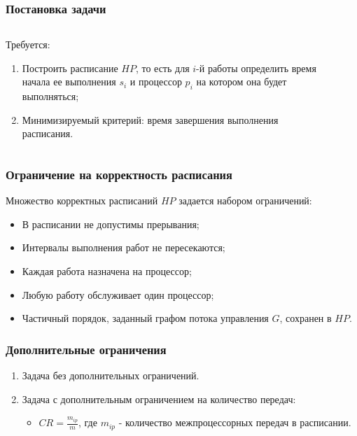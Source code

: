\begin{frame}
    \frametitle{Постановка задачи}
    \begin{columns}
        \begin{column}{0.7\textwidth}
            Требуется:
            \begin{enumerate}
                \item Построить расписание $HP$, то есть для $i$-й работы определить время начала ее выполнения $s_i$ и процессор $p_i$ на котором она будет выполняться;
                \item Минимизируемый критерий: время завершения выполнения расписания.
            \end{enumerate}
        \end{column}
        \begin{column}{0.3\textwidth}
            \begin{figure}
                \tiny
                \captionsetup{labelformat=empty}
            \end{figure}
        \end{column}
    \end{columns}
\end{frame}

\begin{frame}
    \frametitle{Ограничение на корректность расписания}
    Множество корректных расписаний $HP$ задается набором ограничений:
    \begin{itemize}
        \item В расписании не допустимы прерывания;
        \item Интервалы выполнения работ не пересекаются;
        \item Каждая работа назначена на процессор;
        \item Любую работу обслуживает один процессор;
        \item Частичный порядок, заданный графом потока управления $G$, сохранен в $HP$.
    \end{itemize}
\end{frame}

\begin{frame}
    \frametitle{Дополнительные ограничения}
    \begin{enumerate}
        \item Задача без дополнительных ограничений.
        \item Задача с дополнительным ограничением на количество передач:
              \begin{itemize}
                  \item $CR = \frac{m_{ip}}{m}$, где $m_{ip}$ - количество межпроцессорных передач в расписании.
              \end{itemize}
    \end{enumerate}
\end{frame}


